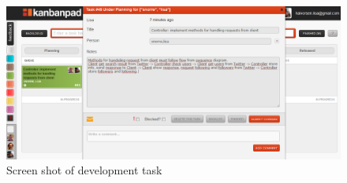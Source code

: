 \begin{figure}[ht]
    \begin{minipage}[b]{1\linewidth}
        \centering
        \includegraphics[width=1\textwidth]{figures/ajajcontroller}
        \caption{Screen shot of development task}
        \label{fig:kanbanScreenShotDevTask}
    \end{minipage}
\end{figure}
